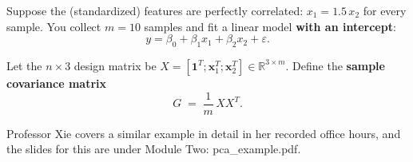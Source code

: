 \documentclass[twoside,12pt]{article}
\begin{document}
Suppose the (standardized) features are perfectly correlated: $x_1 = 1.5\,x_2$ for every sample.  
You collect $m=10$ samples and fit a linear model \textbf{with an intercept}:
\[
y = \beta_0 + \beta_1 x_1 + \beta_2 x_2 + \varepsilon .
\]

Let the $n\times 3$ design matrix be $X=[\mathbf{1}^T; \mathbf{x}_1^T; \mathbf{x}_2^T]\in \mathbb R^{3\times m}$. 
Define the \textbf{sample covariance matrix}
\[
G \;=\; \frac{1}{m}\,X X^T.
\]

    \begin{tcolorbox}[colback=gray!10,colframe=gray!60!black,title=Hint]
    Professor Xie covers a similar example in detail in her recorded office hours, and the slides for this are under Module Two: pca\_example.pdf.
    \end{tcolorbox}
\end{document}
